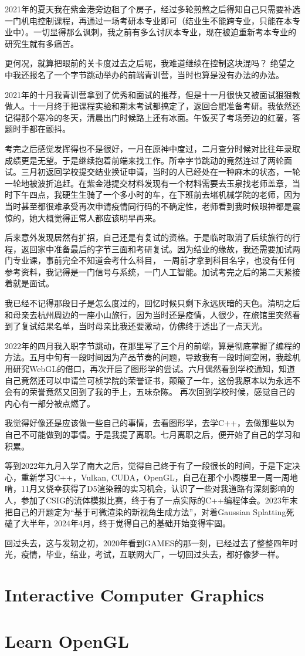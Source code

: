 2021年的夏天我在紫金港旁边租了个房子，经过多轮煎熬之后得知自己只需要补选一门机电控制课程，再通过一场考研本专业即可（结业生不能跨专业，只能在本专业中）。一切显得那么讽刺，我之前有多么讨厌本专业，现在被迫重新考本专业的研究生就有多痛苦。

更何况，就算把眼前的关卡度过去之后呢，我难道继续在控制这块混吗？
绝望之中我还报名了一个字节跳动举办的前端青训营，当时也算是没有办法的办法。

2021年的十月我青训营拿到了优秀和面试的推荐，但是十一月很快又被面试狠狠教做人。十一月终于把课程实验和期末考试都搞定了，返回合肥准备考研。我依然还记得那个寒冷的冬天，清晨出门时候路上还有冰面。午饭买了考场旁边的红薯，答题时手都在颤抖。

考完之后感觉发挥得也不是很好，一月在原神中度过，二月查分时候对比往年录取成绩更是无望。于是继续抱着前端来找工作。所幸字节跳动的竟然连过了两轮面试。三月初返回学校提交结业换证申请，当时的人已经处在一种麻木的状态，一轮一轮地被波折追赶。在紫金港提交材料发现有一个材料需要去玉泉找老师盖章，当时下午四点，我硬生生骑了一个多小时的车，在下班前去堵机械学院的老师，因为当时甚至都很难承受再次申请疫情同行码的不确定性，老师看到我时候眼神都是震惊的，她大概觉得正常人都应该明早再来。

后来意外发现居然有扩招，自己还是有复试的资格。于是临时取消了后续旅行的行程，返回家中准备最后的字节三面和考研复试。因为结业的缘故，我还需要加试两门专业课，事前完全不知道会考什么科目，
一周前才拿到科目名字，也没有任何参考资料，我记得是一门信号与系统，一门人工智能。加试考完之后的第二天紧接着就是面试。

我已经不记得那段日子是怎么度过的，回忆时候只剩下永远灰暗的天色。清明之后和母亲去杭州周边的一座小山旅行，因为当时还是疫情，人很少，在旅馆里突然看到了复试结果名单，当时母亲比我还要激动，仿佛终于透出了一点天光。

2022年的四月我入职字节跳动，在那里写了三个月的前端，算是彻底掌握了编程的方法。五月中旬有一段时间因为产品节奏的问题，导致我有一段时间空闲，我趁机用研究WebGL的借口，再次开启了图形学的尝试。六月偶然看到学校通知，知道自己竟然还可以申请竺可桢学院的荣誉证书，颠簸了一年，这份我原本以为永远不会有的荣誉竟然又回到了我的手上，五味杂陈。
再次回到学校时候，感觉自己的内心有一部分被点燃了。

我觉得好像还是应该做一些自己的事情，去看图形学，去学C++，去做那些以为自己不可能做到的事情。于是我提了离职。七月离职之后，便开始了自己的学习和积累。

等到2022年九月入学了南大之后，觉得自己终于有了一段很长的时间，于是下定决心，重新学习C++，Vulkan, CUDA，OpenGL，自己在那个小阁楼里一周一周地啃，11月又侥幸获得了D5渲染器的实习机会，认识了一些对我道路有深刻影响的人，参加了CSIG的流体模拟比赛，终于有了一点实际的C++编程体会。2023年末把自己的开题定为“基于可微渲染的新视角生成方法”，对着Gaussian Splatting死磕了大半年，2024年4月，终于觉得自己的基础开始变得牢固。

回过头去，这与发轫之初，2020年看到GAMES的那一刻，已经过去了整整四年时光，疫情，毕业，结业，考试，互联网大厂，一切回过头去，都好像梦一样。

\section{Interactive Computer Graphics}



\section{Learn OpenGL}